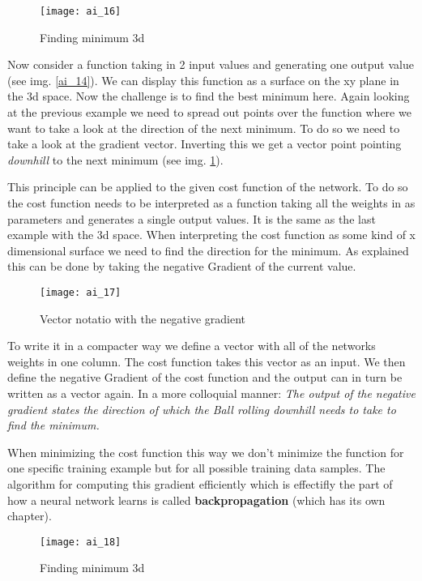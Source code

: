 \documentclass{article}
\begin{document}
\begin{figure}[!htbp]
	\centering
	\texttt{[image: ai\_16]}
	\caption{Finding minimum 3d}
	\label{ai_16}
\end{figure}

Now consider a function taking in 2 input values and generating one output value (see img. \ref{ai_14}). We can display this function as a surface on the xy plane in the 3d space. Now the challenge is to find the best minimum here. Again looking at the previous example we need to spread out points over the function where we want to take a look at the direction of the next minimum. To do so we need to take a look at the gradient vector. Inverting this we get a vector point pointing \textit{downhill} to the next minimum (see img. \ref{ai_16}). 

This principle can be applied to the given cost function of the network. To do so the cost function needs to be interpreted as a function taking all the weights in as parameters and generates a single output values. It is the same as the last example with the 3d space. When interpreting the cost function as some kind of x dimensional surface we need to find the direction for the minimum. As explained this can be done by taking the negative Gradient of the current value. 

\begin{figure}[!htbp]
	\centering
	\texttt{[image: ai\_17]}
	\caption{Vector notatio with the negative gradient}
	\label{ai_17}
\end{figure}

To write it in a compacter way we define a vector with all of the networks weights in one column. The cost function takes this vector as an input. We then define the negative Gradient of the cost function and the output can in turn be written as a vector again. In a more colloquial manner: \textit{The output of the negative gradient states the direction of which the Ball rolling downhill needs to take to find the minimum.}

When minimizing the cost function this way we don't minimize the function for one specific training example but for all possible training data samples. The algorithm for computing this gradient efficiently which is effectifly the part of how a neural network learns is called \textbf{backpropagation} (which has its own chapter). 

\begin{figure}[!htbp]
	\centering
	\texttt{[image: ai\_18]}
	\caption{Finding minimum 3d}
	\label{ai_18}
\end{figure}
\end{document}
